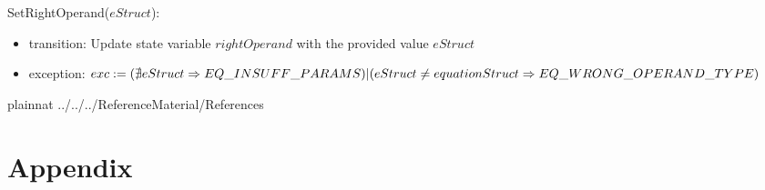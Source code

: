 \documentclass[12pt, titlepage]{article}
\begin{document}
\noindent SetRightOperand($eStruct$):
\begin{itemize}
	\item transition: Update state variable $rightOperand$ with the provided 
	value $eStruct$
	\item exception: $exc := \\
	(\nexists eStruct \Rightarrow EQ\_INSUFF\_PARAMS)\\
	|\\
	(eStruct \neq equationStruct \Rightarrow EQ\_WRONG\_OPERAND\_TYPE)$	
\end{itemize}

\newpage

 {plainnat}
 {../../../ReferenceMaterial/References}

\newpage

\section{Appendix} \label{Appendix}

\renewcommand{\arraystretch}{1.2}
\end{document}

